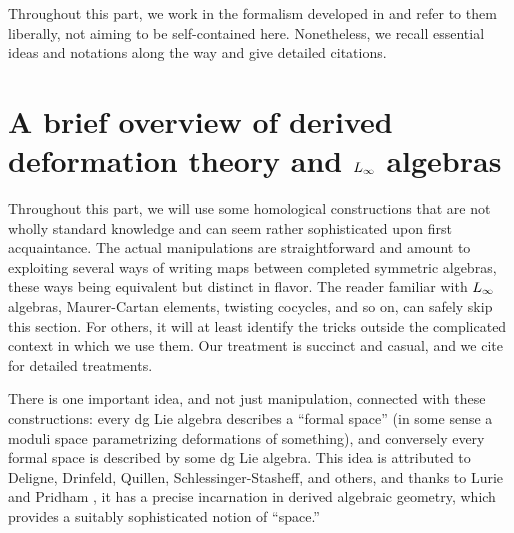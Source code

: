 Throughout this part, we work in the formalism developed in \cite{CosBook,CG}
and refer to them liberally, not aiming to be self-contained here.
Nonetheless, we recall essential ideas and notations along the way and give detailed citations.

\section{A brief overview of derived deformation theory and $\L8$ algebras}
\label{sec DDT}

Throughout this part, we will use some homological constructions 
that are not wholly standard knowledge and 
can seem rather sophisticated upon first acquaintance.
The actual manipulations are straightforward and 
amount to exploiting several ways of writing maps between completed symmetric algebras, 
these ways being equivalent but distinct in flavor.
The reader familiar with $\L8$ algebras, Maurer-Cartan elements, twisting cocycles,
and so on, can safely skip this section.
For others, it will at least identify the tricks outside the complicated context in which we use them.
Our treatment is succinct and casual, and we cite \cite{LV, Hinich, LurieSAG, CG}
for detailed treatments.

There is one important idea, and not just manipulation, connected with these constructions:
every dg Lie algebra describes a ``formal space'' (in some sense a moduli space parametrizing deformations of something), 
and conversely every formal space is described by some dg Lie algebra.
This idea is attributed to Deligne, Drinfeld, Quillen, Schlessinger-Stasheff, and others, 
and thanks to Lurie \cite{LurieSAG} and Pridham \cite{Pridham}, 
it has a precise incarnation in derived algebraic geometry, 
which provides a suitably sophisticated notion of ``space.''

